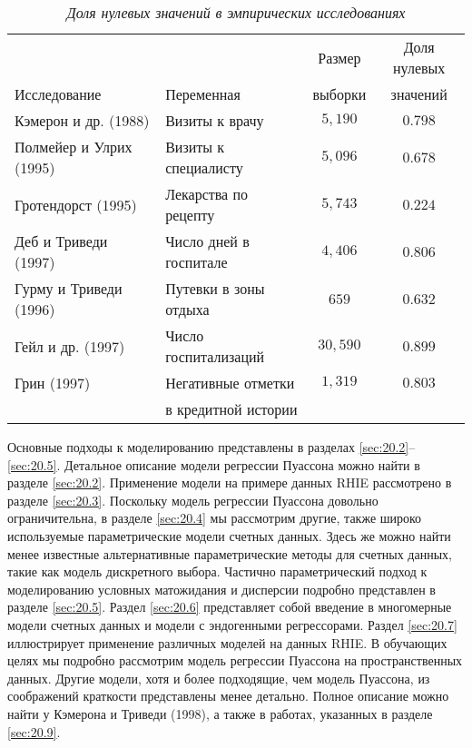     \begin{table}[!ht]\caption{\textit{Доля нулевых значений в эмпирических исследованиях}}\label{tab:20.1}
    \begin{center}
\begin{tabular}{llcc}
\hline \hline
                          &               &Размер         &Доля нулевых\\
Исследование              &Переменная     &выборки        &значений\\
\hline
Кэмерон и др. (1988)     &Визиты к врачу&$5,190$&$0.798$\\
Полмейер и Улрих (1995) &Визиты к специалисту&$5,096$&$0.678$\\
Гротендорст (1995)       &Лекарства по рецепту&$5,743$&$0.224$\\
Деб и Триведи (1997)      &Число дней в госпитале&$4,406$&$0.806$\\
Гурму и Триведи (1996)    &Путевки в зоны отдыха&$659$&$0.632$\\
Гейл и др. (1997)        &Число госпитализаций&$30,590$&$0.899$\\
Грин (1997)             &Негативные отметки&$1,319$&$0.803$\\
                          &в кредитной истории&&\\
\hline \hline
    \end{tabular}
    \end{center}
    \end{table}

Основные подходы к моделированию представлены в разделах \ref{sec:20.2}--\ref{sec:20.5}. Детальное описание модели регрессии Пуассона можно найти в разделе \ref{sec:20.2}. Применение модели на примере данных RHIE рассмотрено в разделе \ref{sec:20.3}. Поскольку модель регрессии Пуассона довольно ограничительна, в разделе \ref{sec:20.4} мы рассмотрим другие, также широко используемые параметрические модели счетных данных. Здесь же можно найти менее известные альтернативные параметрические методы для счетных данных, такие как модель дискретного выбора. Частично параметрический подход к моделированию условных матожидания и дисперсии подробно представлен в разделе \ref{sec:20.5}. Раздел \ref{sec:20.6} представляет собой введение в многомерные модели счетных данных и модели с эндогенными регрессорами. Раздел \ref{sec:20.7} иллюстрирует применение различных моделей на данных RHIE. В обучающих целях мы подробно рассмотрим модель регрессии Пуассона на пространственных данных.  Другие модели, хотя и более подходящие, чем модель Пуассона, из соображений краткости представлены менее детально. Полное описание можно найти у Кэмерона и Триведи (1998), а также в работах, указанных в разделе \ref{sec:20.9}.




